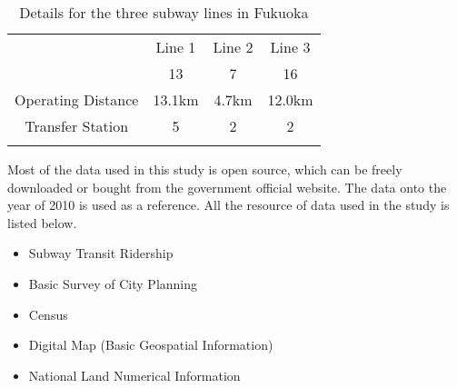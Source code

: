 \begin{table}[htbp]
	\centering
	\caption{Details for the three subway lines in Fukuoka}
	\label{tab:chp4:DetailsSubway}%
	\small
	\renewcommand{\arraystretch}{1.25} %
	\begin{tabular}{cccc}
		\Xhline{1.5pt} %
		\diagbox[height=3em]{Item}{Lines} & Line 1 & Line 2 & Line 3\\ %
		\Xhline{0.5pt}
		
		\multicolumn{1}{c}{Total Stations}
		& 13 & 7 & 16\\
		\multicolumn{1}{c}{Operating Distance}
		& 13.1km & 4.7km & 12.0km \\
		\multicolumn{1}{c}{Transfer Station}
		& 5 & 2 & 2\\
		\Xhline{1.5pt}
	\end{tabular}
\end{table}

%
Most of the data used in this study is open source, which can be freely downloaded or bought from the government official website. The data onto the year of 2010 is used as a reference. All the resource of data used in the study is listed below.

%
\begin{itemize}
	\setlength{\parskip}{0\baselineskip} %
	\item Subway Transit Ridership
	\item Basic Survey of City Planning
	\item Census
	\item Digital Map (Basic Geospatial Information)
	\item National Land Numerical Information
	\setlength{\parskip}{0.7\baselineskip} %
\end{itemize}

%
